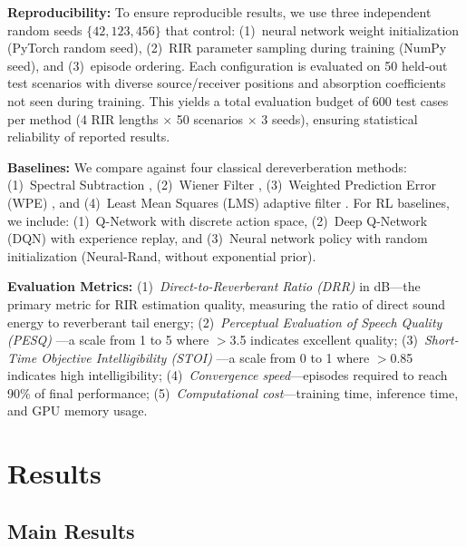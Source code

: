 \documentclass[10pt,conference]{IEEEtran}
\begin{document}
\textbf{Reproducibility:} To ensure reproducible results, we use three independent random seeds $\{42, 123, 456\}$ that control: (1)~neural network weight initialization (PyTorch random seed), (2)~RIR parameter sampling during training (NumPy seed), and (3)~episode ordering. Each configuration is evaluated on 50 held-out test scenarios with diverse source/receiver positions and absorption coefficients not seen during training. This yields a total evaluation budget of 600 test cases per method (4 RIR lengths $\times$ 50 scenarios $\times$ 3 seeds), ensuring statistical reliability of reported results.

\textbf{Baselines:} We compare against four classical dereverberation methods: (1)~Spectral Subtraction \cite{boll1979suppression}, (2)~Wiener Filter \cite{lim1979enhancement}, (3)~Weighted Prediction Error (WPE) \cite{nakatani2010speech}, and (4)~Least Mean Squares (LMS) adaptive filter \cite{haykin2008adaptive}. For RL baselines, we include: (1)~Q-Network with discrete action space, (2)~Deep Q-Network (DQN) with experience replay, and (3)~Neural network policy with random initialization (Neural-Rand, without exponential prior).

\textbf{Evaluation Metrics:} (1)~\textit{Direct-to-Reverberant Ratio (DRR)} in dB---the primary metric for RIR estimation quality, measuring the ratio of direct sound energy to reverberant tail energy; (2)~\textit{Perceptual Evaluation of Speech Quality (PESQ)} \cite{rix2001perceptual}---a scale from 1 to 5 where $>$3.5 indicates excellent quality; (3)~\textit{Short-Time Objective Intelligibility (STOI)} \cite{taal2011algorithm}---a scale from 0 to 1 where $>$0.85 indicates high intelligibility; (4)~\textit{Convergence speed}---episodes required to reach 90\% of final performance; (5)~\textit{Computational cost}---training time, inference time, and GPU memory usage.

\section{Results}

\subsection{Main Results}
\end{document}
